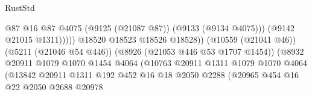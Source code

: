 \begin{lexlean}{RustStd}
\begin{coremodule}
                                                              @87
                                                              @16
                                                              @87
                                                              @4075
                                                              (@9125 (@21087 @87))
                                                              (@9133 (@9134 @4075)))
                                                            (@9142 @21015 @1311)))))
                                                    @18520
                                                    @18523
                                                    @18526
                                                    @18528))
                                                (@10559 (@21041 @46))
                                                (@5211 (@21046 @54 @446))
                                                (@8926 (@21053 @446 @53 @1707 @1454))
                                                (@8932
                                                  @20911
                                                  @1079
                                                  @1070
                                                  @1454
                                                  @4064
                                                  (@10763
                                                    @20911
                                                    @1311
                                                    @1079
                                                    @1070
                                                    @4064
                                                    (@13842
                                                      @20911
                                                      @1311
                                                      @192
                                                      @452
                                                      @16
                                                      @18
                                                      @2050
                                                      @2288
                                                      (@20965
                                                        @454
                                                        @16
                                                        @22
                                                        @2050
                                                        @2688
                                                        @20978

\end{coremodule}
\end{lexlean}
